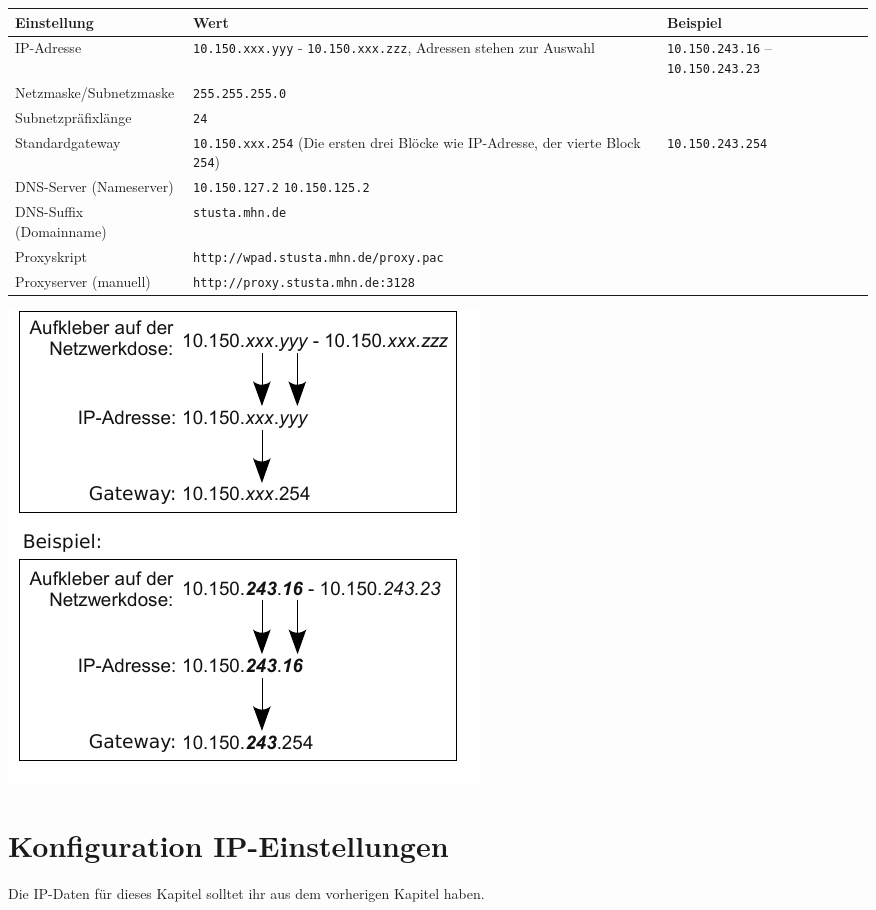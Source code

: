 \documentclass[a4paper,12pt]{scrartcl}
\begin{document}
\begin{minipage}{\textwidth}
\begin{center}
  \begin{tabularx}{\linewidth}{lXp{.2\linewidth}}
    \textbf{Einstellung} & \textbf{Wert} & \textbf{Beispiel} \\
    \midrule
    IP-Adresse & \nolinkurl{10.150.xxx.yyy} - \nolinkurl{10.150.xxx.zzz}, \newline 8 Adressen stehen zur Auswahl & \nolinkurl{10.150.243.16} – \nolinkurl{10.150.243.23} \\
    \hline
    Netzmaske/Subnetzmaske & \nolinkurl{255.255.255.0} & \\
    \hline
    Subnetzpräfixlänge & \nolinkurl{24} & \\
    \hline
    Standardgateway & \nolinkurl{10.150.xxx.254} \newline (Die ersten drei Blöcke wie IP-Adresse, der vierte Block \nolinkurl{254}) & \nolinkurl{10.150.243.254} \\
    \hline
    DNS-Server (Nameserver) & \nolinkurl{10.150.127.2} \newline \nolinkurl{10.150.125.2} & \\
    \hline
    DNS-Suffix (Domainname) & \nolinkurl{stusta.mhn.de} & \\
    \hline
    Proxyskript &{\nolinkurl{http://wpad.stusta.mhn.de/proxy.pac}} & \\ 
    \hline
    Proxyserver (manuell) & {\nolinkurl{http://proxy.stusta.mhn.de:3128}} & \\ 
    \bottomrule
  \end{tabularx}
\includegraphics[width=0.4\linewidth,keepaspectratio]{Bilder/IP_Gerneric}
\end{center}
\end{minipage}

\newpage

\section{Konfiguration IP-Einstellungen}
\label{section_netzweradresse}
Die IP-Daten für dieses Kapitel solltet ihr aus dem vorherigen Kapitel haben.
\end{document}
